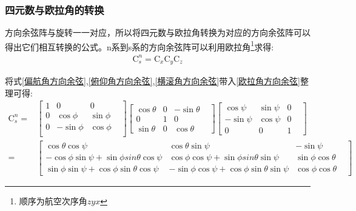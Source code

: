 \documentclass[12pt,a4paper]{article}
\renewcommand{\citep}[1]{\textsuperscript{\cite{#1}}}
\begin{document}
\subsubsection{四元数与欧拉角的转换}\label{section:四元数与欧拉角的转换}
方向余弦阵与旋转一一对应\citep{方向余弦阵}，所以将四元数与欧拉角转换为对应的方向余弦阵可以得出它们相互转换的公式。n系到s系的方向余弦阵可以利用欧拉角\footnote{顺序为航空次序角$zyx$}\citep{捷联惯导航}求得:
\begin{equation}\label{欧拉角方向余弦}
    \begin{split} 
        \mathrm{C}^n_s=\mathrm{C}_x\mathrm{C}_y\mathrm{C}_z
    \end{split}
\end{equation} 

将式\ref{偏航角方向余弦},\ref{俯仰角方向余弦},\ref{横滚角方向余弦}带入\ref{欧拉角方向余弦}整理可得:
\begin{equation}\label{欧拉角n转s}
    \begin{split} 
        \mathrm{C}^n_s=&\left[\begin{matrix}
                1 &           0 &          0 & \\
                0 &  \cos{\phi} & \sin{\phi} & \\
                0 & -\sin{\phi} & \cos{\phi} & \\
                \end{matrix}\right]
                \left[\begin{matrix}
                \cos{\theta} & 0 & -\sin{\theta} & \\
                           0 & 1 &           0 & \\
                \sin{\theta} & 0 &  \cos{\theta} &
                \end{matrix}\right]
                \left[\begin{matrix}
                 \cos{\psi} & \sin{\psi} & 0 & \\
                -\sin{\psi} & \cos{\psi} & 0 & \\
                          0 &          0 & 1 &
                \end{matrix}\right] \\
                =&\left[\begin{matrix}
                \cos{\theta}\cos{\psi} & \cos{\theta}\sin{\psi} & -\sin{\psi} & \\
                -\cos{\phi}\sin{\psi}+\sin{\phi}sin{\theta}\cos{\psi} & \cos{\phi}\cos{\psi}+\sin{\phi}sin{\theta}\sin{\psi} & \sin{\phi}\cos{\theta} & \\
                 \sin{\phi}\sin{\psi} + \cos{\phi}\sin{\theta}\cos{\psi} & -\sin{\phi}\cos{\psi} + \cos{\phi}\sin{\theta}\sin{\psi} & \cos{\phi}\cos{\theta} &
                \end{matrix}\right]
    \end{split}
\end{equation} 
\end{document}
